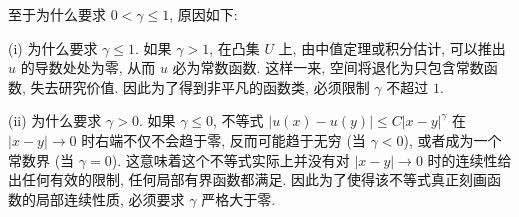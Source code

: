 \documentclass[../../main.tex]{subfiles}
\begin{document}
\begin{remark}
至于为什么要求 $0<\gamma\leqslant 1$, 原因如下:

(i) 为什么要求 $\gamma \leqslant 1$. 如果 $\gamma > 1$, 在凸集 $U$ 上, 由中值定理或积分估计, 可以推出 $u$ 的导数处处为零, 从而 $u$ 必为常数函数. 这样一来, 空间将退化为只包含常数函数, 失去研究价值. 因此为了得到非平凡的函数类, 必须限制 $\gamma$ 不超过 $1$.

(ii) 为什么要求 $\gamma > 0$. 如果 $\gamma \leqslant 0$, 不等式 $|u(x)-u(y)|\leqslant C|x-y|^{\gamma}$ 在 $|x-y|\to 0$ 时右端不仅不会趋于零, 反而可能趋于无穷 (当 $\gamma<0$), 或者成为一个常数界 (当 $\gamma=0$). 这意味着这个不等式实际上并没有对 $|x-y|\to 0$ 时的连续性给出任何有效的限制, 任何局部有界函数都满足. 因此为了使得该不等式真正刻画函数的局部连续性质, 必须要求 $\gamma$ 严格大于零.
\end{remark}
\end{document}

